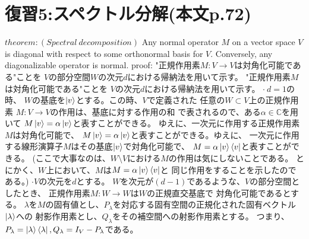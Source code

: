 \section{\Large 復習5:スペクトル分解(本文p.72)}
$theorem :(Spectral~decomposition)$
Any normal operator $M$ on a vector space $V$ is
diagonal with respect to some orthonormal basis for $V$.
Conversely, any diagonalizable operator is normal.
\newline
{\large proof:}
"正規作用素$M:V \rightarrow V$は対角化可能である"ことを
$V$の部分空間$W$の次元$d$における帰納法を用いて示す。
"正規作用素$M$は対角化可能である"ことを
$V$の次元$d$における帰納法を用いて示す。
\newline
$\cdot ~d = 1$の時、
$W$の基底を$\ket{v}$とする。この時、$V$で定義された
任意の$W \subset V$上の正規作用素
$M:V \rightarrow V$の作用は、基底に対する作用の和
で表されるので、ある$\alpha \in \mathbb{C}$を用いて
$M\ket{v} = \alpha \ket{v}$と表すことができる。
ゆえに、一次元に作用する正規作用素$M$は対角化可能で、
$M\ket{v} = \alpha \ket{v}$と表すことができる。ゆえに、
一次元に作用する線形演算子$M$はその基底$\ket{v}$で対角化可能で、
$M = \alpha \ket{v}\bra{v}$と表すことができる。
(ここで大事なのは、$W \setminus V$における$M$の作用は気にしないことである。
とにかく、$W$上において、$M$は$M = \alpha \ket{v}\bra{v}$と
同じ作用をすることを示したのである。)
\newline
$\cdot Vの次元をdとする。$
$W$を次元が$(d - 1)$であるような、$V$の部分空間としたとき、
正規作用素$M:W \rightarrow W$は$W$の正規直交基底で
対角化可能であるとする。
$\lambda$を$M$の固有値とし、$P_\lambda $を対応する固有空間の正規化された固有ベクトル
$\ket{\lambda}$への
射影作用素とし、$Q_\lambda $をその補空間への射影作用素とする。
つまり、$P_\lambda  = \ket{\lambda} \bra{\lambda}, Q_\lambda  = I_V - P_\lambda $である。

